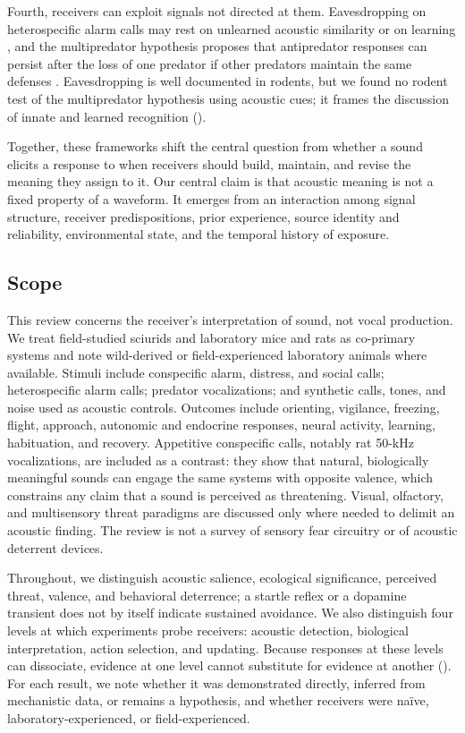 Fourth, receivers can exploit signals not directed at them. Eavesdropping on heterospecific alarm calls may rest on unlearned acoustic similarity or on learning \citep{MagrathEtAl2015}, and the multipredator hypothesis proposes that antipredator responses can persist after the loss of one predator if other predators maintain the same defenses \citep{Blumstein2006}. Eavesdropping is well documented in rodents, but we found no rodent test of the multipredator hypothesis using acoustic cues; it frames the discussion of innate and learned recognition ().

Together, these frameworks shift the central question from whether a sound elicits a response to when receivers should build, maintain, and revise the meaning they assign to it. Our central claim is that acoustic meaning is not a fixed property of a waveform. It emerges from an interaction among signal structure, receiver predispositions, prior experience, source identity and reliability, environmental state, and the temporal history of exposure.

\subsection{Scope}
\label{sec:intro-scope}

This review concerns the receiver's interpretation of sound, not vocal production. We treat field-studied sciurids and laboratory mice and rats as co-primary systems and note wild-derived or field-experienced laboratory animals where available. Stimuli include conspecific alarm, distress, and social calls; heterospecific alarm calls; predator vocalizations; and synthetic calls, tones, and noise used as acoustic controls. Outcomes include orienting, vigilance, freezing, flight, approach, autonomic and endocrine responses, neural activity, learning, habituation, and recovery. Appetitive conspecific calls, notably rat 50-kHz vocalizations, are included as a contrast: they show that natural, biologically meaningful sounds can engage the same systems with opposite valence, which constrains any claim that a sound is perceived as threatening. Visual, olfactory, and multisensory threat paradigms are discussed only where needed to delimit an acoustic finding. The review is not a survey of sensory fear circuitry or of acoustic deterrent devices.

Throughout, we distinguish acoustic salience, ecological significance, perceived threat, valence, and behavioral deterrence; a startle reflex or a dopamine transient does not by itself indicate sustained avoidance. We also distinguish four levels at which experiments probe receivers: acoustic detection, biological interpretation, action selection, and updating. Because responses at these levels can dissociate, evidence at one level cannot substitute for evidence at another (). For each result, we note whether it was demonstrated directly, inferred from mechanistic data, or remains a hypothesis, and whether receivers were naïve, laboratory-experienced, or field-experienced.

